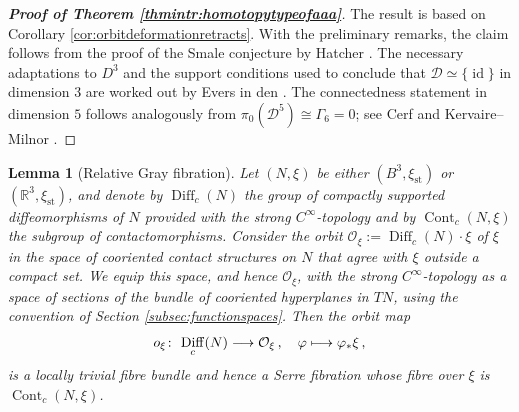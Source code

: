\documentclass{amsart}
\newtheorem{lem}[prop]{Lemma}
\theoremstyle{definition}
\def\co{\colon\thinspace}
\newcommand{\DD}{\mathcal D}
\newcommand{\OO}{\mathcal O}
\newcommand{\R}{\mathbb R}
\newcommand{\lra}{\longrightarrow}
\DeclareMathOperator{\Diff}{\mathrm{Diff}}
\DeclareMathOperator{\id}{\mathrm{id}}
\DeclareMathOperator{\st}{\mathrm{st}}
\begin{document}
\begin{proof}[{\bf Proof of Theorem \ref{thmintr:homotopytypeofaaa}}]
  The result is based on
  Corollary \ref{cor:orbitdeformationretracts}.
  With the preliminary remarks,
  the claim follows from the proof
  of the Smale conjecture
  by Hatcher \cite{hat83}.
  The necessary adaptations to $D^3$
  and the support conditions used
  to conclude that $\DD\simeq\{\id\}$
  in dimension $3$
  are worked out by Evers in den
  \cite[Hülfssätzen 1.2.2 und 2.1.2]{ev11}.
  The connectedness statement in dimension $5$
  follows analogously from
  $\pi_0(\DD^5)\cong\Gamma_6=0$;
  see Cerf \cite{cer70}
  and Kervaire--Milnor \cite{km63}.
\end{proof}


\begin{lem}[Relative Gray fibration]
\label{lem:relativegrayfibration}
Let $(N,\xi)$ be either $(B^3,\xi_{\st})$ or $(\R^3,\xi_{\st})$,
and denote by $\Diff_c(N)$ the group of compactly supported
diffeomorphisms of $N$
provided with the strong $C^{\infty}$-topology
and by $\operatorname{Cont}_c(N,\xi)$
the subgroup of contactomorphisms.
Consider the orbit $\OO_{\xi}:=\Diff_c(N)\cdot\xi$
of $\xi$ in the space of cooriented contact structures on $N$
that agree with $\xi$ outside a compact set.
We equip this space, and hence $\OO_{\xi}$,
with the strong $C^\infty$-topology
as a space of sections of the bundle
of cooriented hyperplanes in $TN$,
using the convention of
Section \ref{subsec:functionspaces}.
Then the orbit map
\[
o_{\xi}\co
\Diff_c(N)\lra\OO_{\xi}
\,,
\quad
\varphi\longmapsto\varphi_*\xi
\,,
\]
is a locally trivial fibre bundle
and hence a Serre fibration
whose fibre over $\xi$ is
$\operatorname{Cont}_c(N,\xi)$.
\end{lem}
\end{document}
